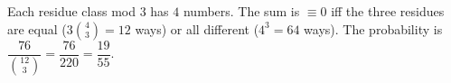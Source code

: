 Each residue class mod $3$ has $4$ numbers. The sum is $\equiv0$ iff the three residues are equal ($3\binom43=12$ ways) or all different ($4^3=64$ ways). The probability is $\dfrac{76}{\binom{12}3}=\dfrac{76}{220}=\boxed{\dfrac{19}{55}}$.
